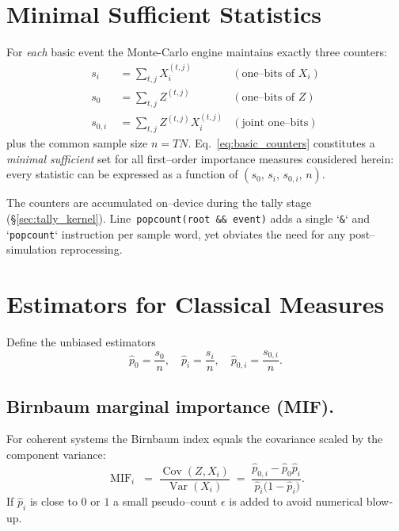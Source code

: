 \section{Minimal Sufficient Statistics}
For \emph{each} basic event the Monte-Carlo engine maintains exactly three
counters:
\begin{equation}
    \label{eq:basic_counters}
    \begin{aligned}
        s_i      &\;= \sum_{t,j}         X_i^{(t,j)}                                  & (\text{one--bits of }X_i)\\
        s_0      &\;= \sum_{t,j}         Z^{(t,j)}                                   & (\text{one--bits of }Z)\\
        s_{0,i}  &\;= \sum_{t,j} Z^{(t,j)} X_i^{(t,j)}                               & (\text{joint one--bits})
    \end{aligned}
\end{equation}
plus the common sample size $n\!=\!T N$.  Eq.~\eqref{eq:basic_counters}
constitutes a \emph{minimal sufficient} set for all first--order importance
measures considered herein: every statistic can be expressed as a function of
$(s_0,\,s_i,\,s_{0,i},\,n)$.

The counters are accumulated on–device during the tally stage
(\S\ref{sec:tally_kernel}).  Line~\texttt{popcount(root \&\& event)} adds a
single `\texttt{\&}` and `\texttt{popcount}` instruction per sample word, yet
obviates the need for any post–simulation reprocessing.

\section{Estimators for Classical Measures}
Define the unbiased estimators
\[\widehat{p}_0 = \frac{s_0}{n}, \quad \widehat{p}_i = \frac{s_i}{n},
   \quad \widehat{p}_{0,i} = \frac{s_{0,i}}{n}.\]

\subsection{Birnbaum marginal importance (MIF).}
For coherent systems the Birnbaum index equals the covariance scaled by the
component variance:
\begin{equation}
   \operatorname{MIF}_i
   \;=\; \frac{\operatorname{Cov}(Z, X_i)}{\operatorname{Var}(X_i)}
   \;=\; \frac{\widehat{p}_{0,i} - \widehat{p}_0\widehat{p}_i}
                {\,\widehat{p}_i\bigl(1-\widehat{p}_i\bigr)}.
   \label{eq:mif_estimator}
\end{equation}
If $\widehat{p}_i$ is close to $0$ or $1$ a small pseudo–count $\epsilon$ is
added to avoid numerical blow‐up.

